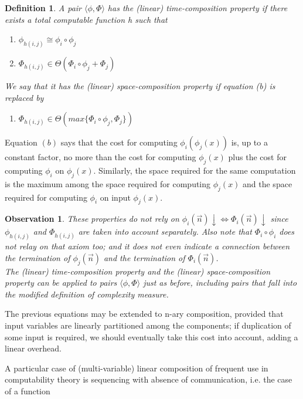 \documentclass[10pt, a4paper, oneside, titlepage, draft]{article}
\newtheorem{definition}[shrd]{Definition}
\newtheorem{observation}{Observation}[shrd]
\begin{document}
\begin{definition}
    A pair $\langle \phi, \Phi \rangle$ has the (linear) time-composition property if there exists a total computable function h such that 
    \begin{enumerate}[label=(\alph*)]
        \item $ \phi_{h(i,j)} \cong \phi_i \circ \phi_j $
        \item $ \Phi_{h(i,j)} \in \Theta(\Phi_i \circ \phi_j + \Phi_j) $
    \end{enumerate}
    We say that it has the (linear) space-composition property if equation (b) is replaced by
    \begin{enumerate}[label=(c)]
        \item $ \Phi_{h(i,j)} \in \Theta(max \{ \Phi_i \circ \phi_j, \Phi_j \}) $
    \end{enumerate}
\end{definition}

\noindent Equation $(b)$ says that the cost for computing $\phi_i(\phi_j(x))$ is, up to a constant factor, no more than the cost for computing $\phi_j(x)$ plus the cost for computing $\phi_i$ on $\phi_j(x)$. Similarly, the space required for the same computation is the maximum among the space required for computing $\phi_j(x)$ and the space required for computing $\phi_i$ on input $\phi_j(x)$. 

\begin{observation}
    These properties do not rely on $\phi_i(\vec{n})\downarrow \iff \Phi_i(\vec{n})\downarrow$ since $\phi_{h(i,j)}$ and $\Phi_{h(i,j)}$ are taken into account separately. Also note that $\Phi_i \circ \phi_i$ does not relay on that axiom too; and it does not even indicate a connection between the termination of $\phi_j(\vec{n})$ and the termination of $\Phi_i(\vec{n})$.
    \\ The (linear) time-composition property and the (linear) space-composition property can be applied to pairs $\langle \phi, \Phi \rangle$ just as before, including pairs that fall into the modified definition of complexity measure.
\end{observation}

The previous equations may be extended to n-ary composition, provided that input variables are linearly partitioned among the components; if duplication of some input is required, we should eventually take this cost into account, adding a linear overhead. 

A particular case of (multi-variable) linear composition of frequent use in computability theory is sequencing with absence of communication, i.e. the case of a function
\end{document}
